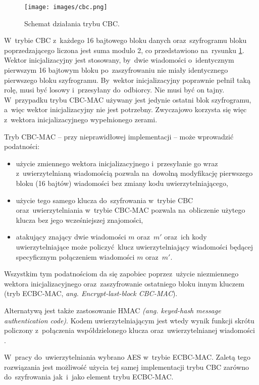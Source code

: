\begin{figure}[ht]
\centering
\texttt{[image: images/cbc.png]}
\caption{Schemat działania trybu CBC.}
\label{fig:cbc}
\end{figure}

W~trybie CBC z~każdego 16 bajtowego bloku danych oraz~szyfrogramu bloku poprzedzającego liczona jest suma modulo 2, co przedstawiono na~rysunku \ref{fig:cbc}. Wektor inicjalizacyjny jest stosowany, by~dwie wiadomości o~identycznym pierwszym 16 bajtowym bloku po~zaszyfrowaniu nie miały identycznego pierwszego bloku szyfrogramu. By~wektor inicjalizacyjny poprawnie pełnił taką rolę, musi być losowy i~przesyłany do~odbiorcy. Nie musi być on tajny. W~przypadku trybu CBC-MAC używany jest jedynie ostatni blok szyfrogramu, a~więc wektor inicjalizacyjny nie jest potrzebny. Zwyczajowo korzysta się więc z~wektora inicjalizacyjnego wypełnionego zerami.

\FloatBarrier

Tryb CBC-MAC -- przy nieprawidłowej implementacji -- może wprowadzić podatności:

\begin{itemize}
    \item użycie zmiennego wektora inicjalizacyjnego i~przesyłanie go wraz z~uwierzytelnianą wiadomością pozwala na~dowolną modyfikację pierwszego bloku (16 bajtów) wiadomości bez zmiany kodu uwierzytelniającego,
    \item użycie tego samego klucza do~szyfrowania w~trybie CBC oraz~uwierzytelniania w~trybie CBC-MAC pozwala na~obliczenie użytego klucza bez jego wcześniejszej znajomości,
    \item atakujący znający dwie wiadomości $ m $ oraz~$ m' $ oraz~ich kody uwierzytelniające może policzyć klucz uwierzytelniający wiadomości będącej specyficznym połączeniem wiadomości $ m $ oraz~$ m' $.
\end{itemize}

Wszystkim tym podatnościom da się zapobiec poprzez~użycie niezmiennego wektora inicjalizacyjnego oraz~zaszyfrowanie ostatniego bloku innym kluczem (tryb ECBC-MAC, {\itshape ang. Encrypt-last-block CBC-MAC}).

Alternatywą jest także zastosowanie HMAC {\itshape (ang. keyed-hash message authentication code)}. Kodem uwierzytelniającym jest wtedy wynik funkcji skrótu policzony z~połączenia współdzielonego klucza oraz~uwierzytelnianej wiadomości \cite{krawczyk1997hmac}.

W~pracy do~uwierzytelniania wybrano AES w~trybie ECBC-MAC. Zaletą tego rozwiązania jest możliwość użycia tej samej implementacji trybu CBC zarówno do~szyfrowania jak~i~jako element trybu ECBC-MAC.

